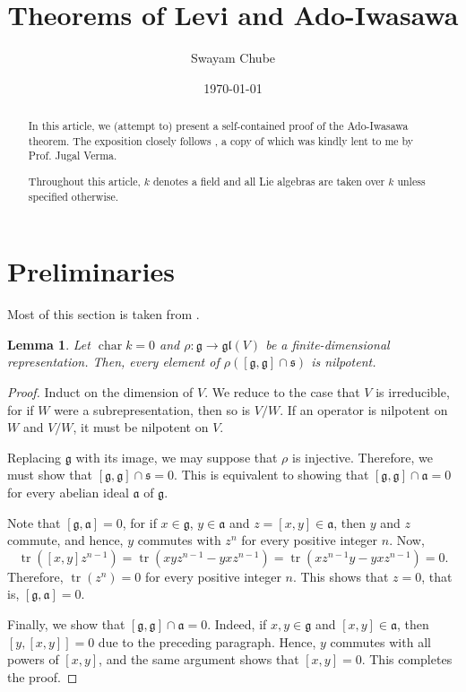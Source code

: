 \documentclass[12pt]{article}
\title{Theorems of Levi and Ado-Iwasawa}
\author{Swayam Chube}
\date{\today}
\theoremstyle{thmstyle}
\newtheorem{lemma}[theorem]{Lemma}
\theoremstyle{defstyle}
\newcommand{\chr}{\operatorname{char}}
\newcommand{\tr}{\operatorname{tr}}
\newcommand{\fraka}{\mathfrak{a}} %
\newcommand{\frakg}{\mathfrak{g}}
\newcommand{\fraks}{\mathfrak{s}}
\newcommand{\gl}{\mathfrak{gl}}
\begin{document}
\maketitle

\begin{abstract}
    In this article, we (attempt to) present a self-contained proof of the Ado-Iwasawa theorem. The exposition closely follows \cite{jacobson-lie}, a copy of which was kindly lent to me by Prof. Jugal Verma.

    Throughout this article, $k$ denotes a field and all Lie algebras are taken over $k$ unless specified otherwise.
\end{abstract}

\section{Preliminaries}
Most of this section is taken from \cite{fulton-harris}.

\begin{lemma}
    Let $\chr k = 0$ and $\rho:\frakg\to\gl(V)$ be a finite-dimensional representation. Then, every element of $\rho([\frakg,\frakg]\cap\fraks)$ is nilpotent.
\end{lemma}
\begin{proof}
    Induct on the dimension of $V$. We reduce to the case that $V$ is irreducible, for if $W$ were a subrepresentation, then so is $V/W$. If an operator is nilpotent on $W$ and $V/W$, it must be nilpotent on $V$.

    Replacing $\frakg$ with its image, we may suppose that $\rho$ is injective. Therefore, we must show that $[\frakg, \frakg]\cap\fraks = 0$. This is equivalent to showing that $[\frakg, \frakg]\cap\fraka = 0$ for every abelian ideal $\fraka$ of $\frakg$.

    Note that $[\frakg, \fraka] = 0$, for if $x\in\frakg$, $y\in\fraka$ and $z = [x,y]\in\fraka$, then $y$ and $z$ commute, and hence, $y$ commutes with $z^n$ for every positive integer $n$. Now, 
    \begin{equation*}
        \tr([x,y]z^{n - 1}) = \tr(xyz^{n - 1} - yxz^{n - 1}) = \tr(xz^{n - 1}y - yxz^{n - 1}) = 0.
    \end{equation*}
    Therefore, $\tr(z^n) = 0$ for every positive integer $n$. This shows that $z = 0$, that is, $[\frakg, \fraka] = 0$.

    Finally, we show that $[\frakg,\frakg]\cap\fraka = 0$. Indeed, if $x,y\in\frakg$ and $[x,y]\in\fraka$, then $[y, [x, y]] = 0$ due to the preceding paragraph. Hence, $y$ commutes with all powers of $[x,y]$, and the same argument shows that $[x,y] = 0$. This completes the proof.
\end{proof}
\end{document}
